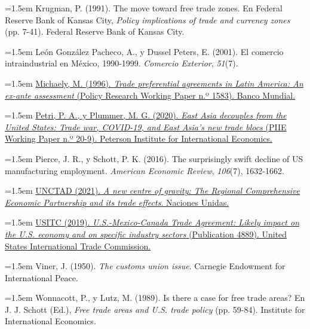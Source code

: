 \documentclass[10pt,a4paper]{article}
\begin{document}
\noindent\hangindent=1.5em Krugman, P. (1991). The move toward free trade zones. En Federal Reserve Bank of Kansas City, \textit{Policy implications of trade and currency zones} (pp. 7-41). Federal Reserve Bank of Kansas City.

\noindent\hangindent=1.5em León González Pacheco, A., y Dussel Peters, E. (2001). El comercio intraindustrial en México, 1990-1999. \textit{Comercio Exterior}, \textit{51}(7).

\noindent\hangindent=1.5em \href{https://ideas.repec.org/p/wbk/wbrwps/1583.html}{Michaely, M. (1996). \textit{Trade preferential agreements in Latin America: An ex-ante assessment} (Policy Research Working Paper n.º 1583). Banco Mundial.}

\noindent\hangindent=1.5em \href{https://www.piie.com/publications/working-papers/east-asia-decouples-united-states-trade-war-covid-19-and-east-asias-new}{Petri, P. A., y Plummer, M. G. (2020). \textit{East Asia decouples from the United States: Trade war, COVID-19, and East Asia's new trade blocs} (PIIE Working Paper n.º 20-9). Peterson Institute for International Economics.}

\noindent\hangindent=1.5em Pierce, J. R., y Schott, P. K. (2016). The surprisingly swift decline of US manufacturing employment. \textit{American Economic Review}, \textit{106}(7), 1632-1662.

\noindent\hangindent=1.5em \href{https://unctad.org/publication/new-centre-gravity-regional-comprehensive-economic-partnership-and-its-trade-effects}{UNCTAD (2021). \textit{A new centre of gravity: The Regional Comprehensive Economic Partnership and its trade effects}. Naciones Unidas.}

\noindent\hangindent=1.5em \href{https://www.usitc.gov/press_room/news_release/2019/er0418ll1087.htm}{USITC (2019). \textit{U.S.-Mexico-Canada Trade Agreement: Likely impact on the U.S. economy and on specific industry sectors} (Publication 4889). United States International Trade Commission.}

\noindent\hangindent=1.5em Viner, J. (1950). \textit{The customs union issue}. Carnegie Endowment for International Peace.

\noindent\hangindent=1.5em Wonnacott, P., y Lutz, M. (1989). Is there a case for free trade areas? En J. J. Schott (Ed.), \textit{Free trade areas and U.S. trade policy} (pp. 59-84). Institute for International Economics.
\end{document}

